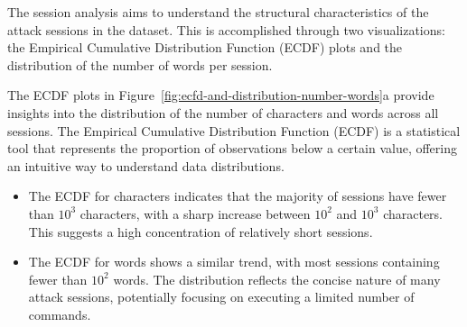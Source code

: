         The session analysis aims to understand the structural characteristics of the attack sessions in the dataset. This is accomplished through two visualizations: the Empirical Cumulative Distribution Function (ECDF) plots and the distribution of the number of words per session.

        The ECDF plots in Figure~\ref{fig:ecfd-and-distribution-number-words}a provide insights into the distribution of the number of characters and words across all sessions. The Empirical Cumulative Distribution Function (ECDF) is a statistical tool that represents the proportion of observations below a certain value, offering an intuitive way to understand data distributions.
        
        \begin{itemize}
        
            \item The ECDF for characters indicates that the majority of sessions have fewer than $10^3$ characters, with a sharp increase between $10^2$ and $10^3$ characters. This suggests a high concentration of relatively short sessions.
            
            \item The ECDF for words shows a similar trend, with most sessions containing fewer than $10^2$ words. The distribution reflects the concise nature of many attack sessions, potentially focusing on executing a limited number of commands.
            
        \end{itemize}
        
        \vspace{-0.5em}
        
